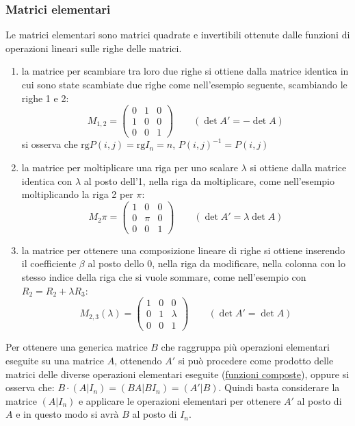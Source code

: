 \documentclass[a4paper]{article}
\newcommand\rg{\text{rg}} 		%
\begin{document}
\subsubsection*{Matrici elementari}
Le matrici elementari sono matrici quadrate e invertibili ottenute dalle funzioni di operazioni lineari sulle righe delle matrici.
\begin{enumerate}
	\item la matrice per scambiare tra loro due righe si ottiene dalla matrice identica in cui sono state scambiate due righe
	come nell'esempio seguente, scambiando le righe 1 e 2:
	\[M_{1,2} = \begin{pmatrix}
		0 & 1 & 0 \\
		1 & 0 & 0 \\
		0 & 0 & 1
	\end{pmatrix} \qquad (\det A' = -\det A)\]
	si osserva che \(\rg P(i,j) = \rg I_n = n\), \(P(i,j)^{-1} = P(i,j)\)
	
	\item la matrice per moltiplicare una riga per uno scalare \(\lambda\) si ottiene dalla matrice identica con \(\lambda\)
	al posto dell'1, nella riga da moltiplicare, come nell'esempio moltiplicando la riga 2 per \(\pi\):
	\[M_2\pi = \begin{pmatrix}
		1 & 0 & 0 \\
		0 & \pi & 0 \\
		0 & 0 & 1
	\end{pmatrix} \qquad (\det A' = \lambda \det A)\]
	
	\item la matrice per ottenere una composizione lineare di righe si ottiene inserendo il coefficiente \(\beta\) al posto
	dello 0, nella riga da modificare, nella colonna con lo stesso indice della riga che si vuole sommare, come nell'esempio
	con \(R_2 = R_2 + \lambda R_3\):
	\[M_{2,3}(\lambda) = \begin{pmatrix}
		1 & 0 & 0 \\
		0 & 1 & \lambda \\
		0 & 0 & 1
	\end{pmatrix} \qquad (\det A' = \det A)\]
\end{enumerate}

Per ottenere una generica matrice \(B\) che raggruppa più operazioni elementari eseguite su una matrice \(A\), ottenendo \(A'\)
si può procedere come prodotto delle matrici delle diverse operazioni elementari eseguite (\hyperlink{composizioneFunzioniCambiamentiDiBase}{funzioni composte}),
oppure si osserva che: \(B \cdot (A|I_n) = (BA | BI_n) = (A'|B)\). Quindi basta considerare la matrice \((A|I_n)\) e applicare
le operazioni elementari per ottenere \(A'\) al posto di \(A\) e in questo modo si avrà \(B\) al posto di \(I_n\).
\end{document}
